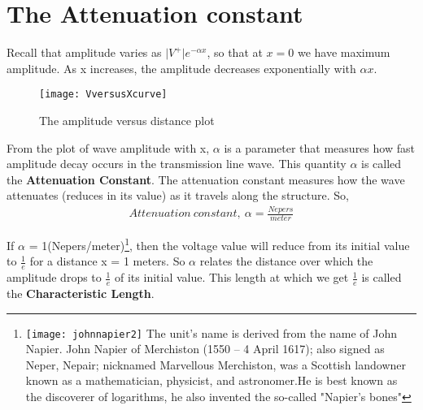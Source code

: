 \section{The Attenuation constant}
Recall that amplitude varies as $\lvert V^+ \rvert e^{-\alpha x}$, so that at $x = 0$ we have maximum amplitude. As x increases, the amplitude decreases exponentially with $\alpha x$. 
\begin{figure}[h]
	\centering
	\texttt{[image: VversusXcurve]}
	\caption{The amplitude versus distance plot}
\end{figure}

From the plot of wave amplitude with x, $\alpha$ is a parameter that measures how fast amplitude decay occurs in the transmission line wave. This quantity $\alpha$ is called the \textbf{Attenuation Constant}. The attenuation constant measures how the wave attenuates (reduces in its value) as it travels along the structure. So,
\begin{align*}
Attenuation \ constant,\ \alpha = \frac{Nepers}{meter}
\end{align*}

If $\alpha$ = 1(Nepers/meter)\footnote{
	\texttt{[image: johnnapier2]}
	The unit's name is derived from the name of John Napier. John Napier of Merchiston (1550 – 4 April 1617); also signed as Neper, Nepair; nicknamed Marvellous Merchiston, was a Scottish landowner known as a mathematician, physicist, and astronomer.He is best known as the discoverer of logarithms, he also invented the so-called "Napier's bones"}, then the voltage value will reduce from its initial value to $\frac{1}{e}$ for a distance x = 1 meters. So $\alpha$ relates the distance over which the amplitude drops to $\frac{1}{e}$ of its initial value. This length at which we get $\frac{1}{e}$ is called the \textbf{Characteristic Length}. 

